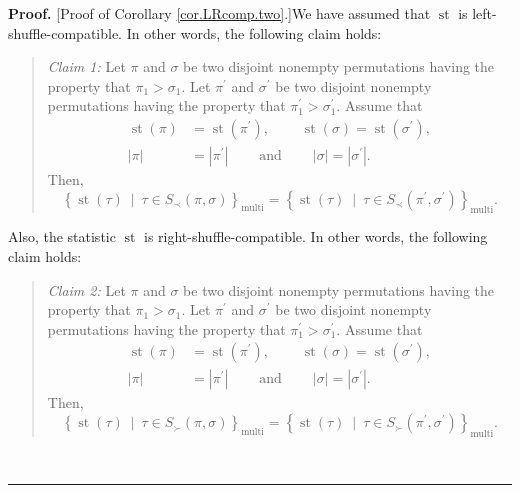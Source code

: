 \documentclass[numbers=enddot,12pt,final,onecolumn,notitlepage]{scrartcl}%
\theoremstyle{definition}
\newenvironment{statement}{\begin{quote}}{\end{quote}}
\newenvironment{proof}[1][Proof]{\noindent\textbf{#1.} }{\ \rule{0.5em}{0.5em}}
\newenvironment{verlong}{}{}
\begin{document}
\begin{verlong}
\begin{proof}
[Proof of Corollary \ref{cor.LRcomp.two}.]We have assumed that
$\operatorname*{st}$ is left-shuffle-compatible. In other words, the following
claim holds:

\begin{statement}
\textit{Claim 1:} Let $\pi$ and $\sigma$ be two disjoint nonempty permutations
having the property that $\pi_{1}>\sigma_{1}$. Let $\pi^{\prime}$ and
$\sigma^{\prime}$ be two disjoint nonempty permutations having the property
that $\pi_{1}^{\prime}>\sigma_{1}^{\prime}$. Assume that%
\begin{align*}
\operatorname*{st}\left(  \pi\right)   &  =\operatorname*{st}\left(
\pi^{\prime}\right)  ,\ \ \ \ \ \ \ \ \ \ \operatorname*{st}\left(
\sigma\right)  =\operatorname*{st}\left(  \sigma^{\prime}\right)  ,\\
\left\vert \pi\right\vert  &  =\left\vert \pi^{\prime}\right\vert
\ \ \ \ \ \ \ \ \ \ \text{and}\ \ \ \ \ \ \ \ \ \ \left\vert \sigma\right\vert
=\left\vert \sigma^{\prime}\right\vert .
\end{align*}
Then,
\[
\left\{  \operatorname*{st}\left(  \tau\right)  \ \mid\ \tau\in S_{\prec
}\left(  \pi,\sigma\right)  \right\}  _{\operatorname*{multi}}=\left\{
\operatorname*{st}\left(  \tau\right)  \ \mid\ \tau\in S_{\prec}\left(
\pi^{\prime},\sigma^{\prime}\right)  \right\}  _{\operatorname*{multi}}.
\]

\end{statement}

Also, the statistic $\operatorname*{st}$ is right-shuffle-compatible. In other
words, the following claim holds:

\begin{statement}
\textit{Claim 2:} Let $\pi$ and $\sigma$ be two disjoint nonempty permutations
having the property that $\pi_{1}>\sigma_{1}$. Let $\pi^{\prime}$ and
$\sigma^{\prime}$ be two disjoint nonempty permutations having the property
that $\pi_{1}^{\prime}>\sigma_{1}^{\prime}$. Assume that%
\begin{align*}
\operatorname*{st}\left(  \pi\right)   &  =\operatorname*{st}\left(
\pi^{\prime}\right)  ,\ \ \ \ \ \ \ \ \ \ \operatorname*{st}\left(
\sigma\right)  =\operatorname*{st}\left(  \sigma^{\prime}\right)  ,\\
\left\vert \pi\right\vert  &  =\left\vert \pi^{\prime}\right\vert
\ \ \ \ \ \ \ \ \ \ \text{and}\ \ \ \ \ \ \ \ \ \ \left\vert \sigma\right\vert
=\left\vert \sigma^{\prime}\right\vert .
\end{align*}
Then,
\[
\left\{  \operatorname*{st}\left(  \tau\right)  \ \mid\ \tau\in S_{\succ
}\left(  \pi,\sigma\right)  \right\}  _{\operatorname*{multi}}=\left\{
\operatorname*{st}\left(  \tau\right)  \ \mid\ \tau\in S_{\succ}\left(
\pi^{\prime},\sigma^{\prime}\right)  \right\}  _{\operatorname*{multi}}.
\]


\end{statement}
\end{proof}
\end{verlong}
\end{document}
